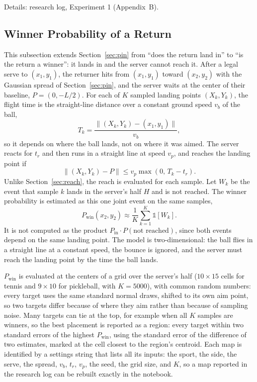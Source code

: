   Details: research log, Experiment 1 (Appendix~B).

  \subsection{Winner Probability of a Return}\label{sec:pwin}

  This subsection extends Section~\ref{sec:pin} from ``does the return land
  in'' to ``is the return a winner'': it lands in and the server cannot reach
  it. After a legal serve to $(x_1, y_1)$, the returner hits from $(x_1, y_1)$
  toward $(x_2, y_2)$ with the Gaussian spread of Section~\ref{sec:pin}, and
  the server waits at the center of their baseline, $P = (0, -L/2)$. For each
  of $K$ sampled landing points $(X_k, Y_k)$, the flight time is the
  straight-line distance over a constant ground speed $v_b$ of the ball,
  \begin{equation}
  T_k = \frac{\lVert (X_k, Y_k) - (x_1, y_1) \rVert}{v_b} ,
  \end{equation}
  so it depends on where the ball lands, not on where it was aimed. The server
  reacts for $t_r$ and then runs in a straight line at speed $v_p$, and reaches
  the landing point if
  \begin{equation}
  \lVert (X_k, Y_k) - P \rVert \le v_p \max(0, \, T_k - t_r) .
  \end{equation}
  Unlike Section~\ref{sec:reach}, the reach is evaluated for each sample. Let
  $W_k$ be the event that sample $k$ lands in the server's half $H$ and is not
  reached. The winner probability is estimated as this one joint event on the
  same samples,
  \begin{equation}
  P_{\mathrm{win}}(x_2, y_2) \approx \frac{1}{K} \sum_{k=1}^{K}
  \mathbb{1}[W_k] .
  \end{equation}
  It is not computed as the product $P_{\mathrm{in}} \cdot P(\text{not
  reached})$, since both events depend on the same landing point. The model is
  two-dimensional: the ball flies in a straight line at a constant speed, the
  bounce is ignored, and the server must reach the landing point by the time
  the ball lands.

  $P_{\mathrm{win}}$ is evaluated at the centers of a grid over the server's
  half ($10 \times 15$ cells for tennis and $9 \times 10$ for pickleball, with
  $K = 5000$), with common random numbers: every target uses the same standard
  normal draws, shifted to its own aim point, so two targets differ because of
  where they aim rather than because of sampling noise. Many targets can tie at
  the top, for example when all $K$ samples are winners, so the best placement
  is reported as a region: every target within two standard errors of the
  highest $P_{\mathrm{win}}$, using the standard error of the difference of two
  estimates, marked at the cell closest to the region's centroid. Each map is
  identified by a settings string that lists all its inputs: the sport, the
  side, the serve, the spread, $v_b$, $t_r$, $v_p$, the seed, the grid size,
  and $K$, so a map reported in the research log can be rebuilt exactly in the
  notebook.

